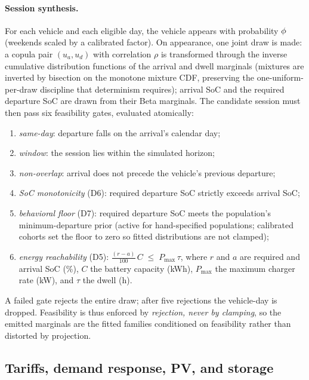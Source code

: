 \paragraph{Session synthesis.}
For each vehicle and each eligible day, the vehicle appears with probability
$\phi$ (weekends scaled by a calibrated factor). On appearance, one joint
draw is made: a copula pair $(u_a, u_d)$ with correlation $\rho$ is
transformed through the inverse cumulative distribution functions of the
arrival and dwell marginals (mixtures are inverted by bisection on the
monotone mixture CDF, preserving the one-uniform-per-draw discipline that
determinism requires); arrival SoC and the required departure SoC are drawn
from their Beta marginals. The candidate session must then pass six
feasibility gates, evaluated atomically:
\begin{enumerate}
\item \emph{same-day}: departure falls on the arrival's calendar day;
\item \emph{window}: the session lies within the simulated horizon;
\item \emph{non-overlap}: arrival does not precede the vehicle's previous
  departure;
\item \emph{SoC monotonicity} (D6): required departure SoC strictly exceeds
  arrival SoC;
\item \emph{behavioral floor} (D7): required departure SoC meets the
  population's minimum-departure prior (active for hand-specified
  populations; calibrated cohorts set the floor to zero so fitted
  distributions are not clamped);
\item \emph{energy reachability} (D5):
  $\frac{(r - a)}{100}\,C \;\le\; P_{\max}\, \tau$,
  where $r$ and $a$ are required and arrival SoC (\%), $C$ the battery
  capacity (kWh), $P_{\max}$ the maximum charger rate (kW), and $\tau$ the
  dwell (h).
\end{enumerate}
A failed gate rejects the entire draw; after five rejections the vehicle-day
is dropped. Feasibility is thus enforced by \emph{rejection, never by
clamping}, so the emitted marginals are the fitted families conditioned on
feasibility rather than distorted by projection.

\subsection{Tariffs, demand response, PV, and storage}
\label{sec:der}

